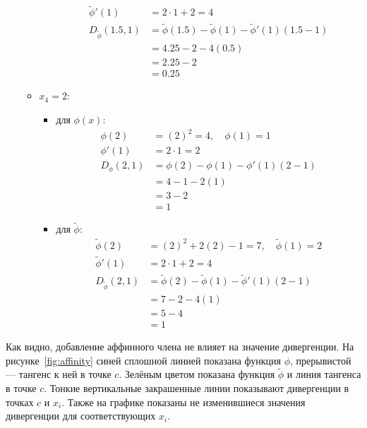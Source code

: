 \documentclass[12pt]{scrartcl}
\begin{document}
\begin{enumerate}
\begin{itemize}
\begin{itemize}
\begin{align*}
                \tilde{\phi}'(1) &= 2 \cdot 1 + 2 = 4 \\
                D_{\tilde{\phi}}(1.5, 1) &= \tilde{\phi}(1.5) - \tilde{\phi}(1) - \tilde{\phi}'(1)(1.5 - 1) \\
                &= 4.25 - 2 - 4(0.5) \\
                &= 2.25 - 2 \\
                &= 0.25
            \end{align*}
        \end{itemize}
        \item $x_{4} = 2 $:
        \begin{itemize}
            \item для $\phi(x)$:
            \begin{align*}
                \phi(2) &= (2)^2 = 4, \quad \phi(1) = 1 \\
                \phi'(1) &= 2 \cdot 1 = 2 \\
                D_{\phi}(2, 1) &= \phi(2) - \phi(1) - \phi'(1)(2 - 1) \\
                &= 4 - 1 - 2(1) \\
                &= 3 - 2 \\
                &= 1
            \end{align*}
            \item для $\tilde{\phi}$:
            \begin{align*}
                \tilde{\phi}(2) &= (2)^2 + 2(2) - 1 = 7, \quad \tilde{\phi}(1) = 2 \\
                \tilde{\phi}'(1) &= 2 \cdot 1 + 2 = 4 \\
                D_{\tilde{\phi}}(2, 1) &= \tilde{\phi}(2) - \tilde{\phi}(1) - \tilde{\phi}'(1)(2 - 1) \\
                &= 7 - 2 - 4(1) \\
                &= 5 - 4 \\
                &= 1
            \end{align*}
        \end{itemize}
    \end{itemize}
\end{enumerate}
Как видно, добавление аффинного члена не влияет на значение дивергенции. На рисунке~\ref{fig:affinity} синей сплошной линией показана функция $\phi$, прерывистой --- тангенс к ней в точке $c$. Зелёным цветом показана функция $\tilde{\phi}$ и линия тангенса в точке $c$. Тонкие вертикальные закрашенные линии показывают дивергенции в точках $c$ и $x_{i}$. Также на графике показаны не изменившиеся значения дивергенции для соответствующих $x_{i}$.
\end{document}
